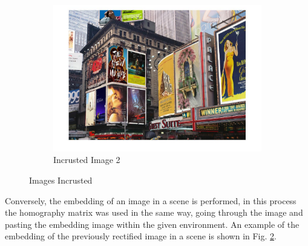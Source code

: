 \documentclass[12pt, twoside]{report}
\begin{document}
\begin{enumerate}
\begin{figure}[H]
\begin{subfigure}[b]{0.3\textwidth}
         \includegraphics[width=\textwidth]{images/tp_2/incruste3.jpg}
         \caption{Incrusted Image 2}
         \label{fig:inc3}
     \end{subfigure}
     
     \hfill 
        \caption{Images Incrusted}
        \label{fig:inctotal}
\end{figure}

Conversely, the embedding of an image in a scene is performed, in this process the homography matrix was used in the same way, going through the image and pasting the embedding image within the given environment. An example of the embedding of the previously rectified image in a scene is shown in Fig. \ref{fig:inctotal}.

\end{enumerate}
\end{document}

